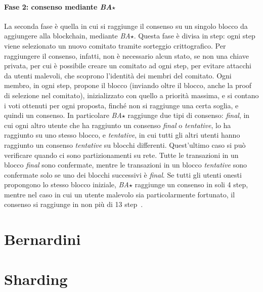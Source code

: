 \paragraph*{Fase 2: consenso mediante \emph{BA$\star$}}
La seconda fase è quella in cui si raggiunge il consenso su un singolo blocco da aggiungere alla blockchain, mediante \emph{BA$\star$}. Questa fase è divisa in step: ogni step viene selezionato un nuovo comitato tramite sorteggio crittografico. Per raggiungere il consenso, infatti, non è necessario alcun stato, se non una chiave privata, per cui è possibile creare un comitato ad ogni step, per evitare attacchi da utenti malevoli, che scoprono l'identità dei membri del comitato.
Ogni membro, in ogni step, propone il blocco (inviando oltre il blocco, anche la proof di selezione nel comitato), inizializzato con quello a priorità massima, e si contano i voti ottenuti per ogni proposta, finché non si raggiunge una certa soglia, e quindi un consenso. In particolare \emph{BA$\star$} raggiunge due tipi di consenso: \emph{final}, in cui ogni altro utente che ha raggiunto un consenso \emph{final} o \emph{tentative}, lo ha raggiunto su uno stesso blocco, e \emph{tentative}, in cui tutti gli altri utenti hanno raggiunto un consenso \emph{tentative} su blocchi differenti. Quest'ultimo caso si può verificare quando ci sono partizionamenti su rete. Tutte le transazioni in un blocco \emph{final} sono confermate, mentre le transazioni in un blocco \emph{tentative} sono confermate solo se uno dei blocchi successivi è \emph{final}.
Se tutti gli utenti onesti propongono lo stesso blocco iniziale, \emph{BA$\star$} raggiunge un consenso in soli 4 step, mentre nel caso in cui un utente malevolo sia particolarmente fortunato, il consenso si raggiunge in non più di 13 step~\cite{chen2019algorand}.

\section{Bernardini}

\section{Sharding}